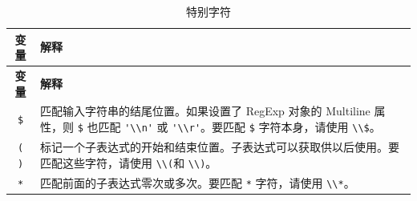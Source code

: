 \documentclass[doctor,openright,twoside]{sjtuthesis}
\newcommand{\passthrough}[1]{#1}
\theoremstyle{plain}
\theoremstyle{definition}
\theoremstyle{remark}
\theoremstyle{ocrenumbox}
\theoremstyle{plain}
\begin{document}
\begin{longtable}[]{@{}cl@{}}
\caption{特别字符}\tabularnewline
\toprule
\begin{minipage}[b]{0.23\columnwidth}\centering
\textbf{变量}\strut
\end{minipage} & \begin{minipage}[b]{0.72\columnwidth}\raggedright
\textbf{解释}\strut
\end{minipage}\tabularnewline
\midrule
\endfirsthead
\toprule
\begin{minipage}[b]{0.23\columnwidth}\centering
\textbf{变量}\strut
\end{minipage} & \begin{minipage}[b]{0.72\columnwidth}\raggedright
\textbf{解释}\strut
\end{minipage}\tabularnewline
\midrule
\endhead
\begin{minipage}[t]{0.23\columnwidth}\centering
\passthrough{\lstinline!$!}\strut
\end{minipage} & \begin{minipage}[t]{0.72\columnwidth}\raggedright
匹配输入字符串的结尾位置。如果设置了 RegExp 对象的 Multiline 属性，则
\passthrough{\lstinline!$!} 也匹配 \passthrough{\lstinline!'\\n'!} 或
\passthrough{\lstinline!'\\r'!}。要匹配 \passthrough{\lstinline!$!}
字符本身，请使用 \passthrough{\lstinline!\\$!}。\strut
\end{minipage}\tabularnewline
\begin{minipage}[t]{0.23\columnwidth}\centering
\passthrough{\lstinline!( )!}\strut
\end{minipage} & \begin{minipage}[t]{0.72\columnwidth}\raggedright
标记一个子表达式的开始和结束位置。子表达式可以获取供以后使用。要匹配这些字符，请使用
\passthrough{\lstinline!\\(!}和 \passthrough{\lstinline!\\)!}。\strut
\end{minipage}\tabularnewline
\begin{minipage}[t]{0.23\columnwidth}\centering
\passthrough{\lstinline!*!}\strut
\end{minipage} & \begin{minipage}[t]{0.72\columnwidth}\raggedright
匹配前面的子表达式零次或多次。要匹配 \passthrough{\lstinline!*!}
字符，请使用 \passthrough{\lstinline!\\*!}。\strut
\end{minipage}\tabularnewline

\end{longtable}
\end{document}
